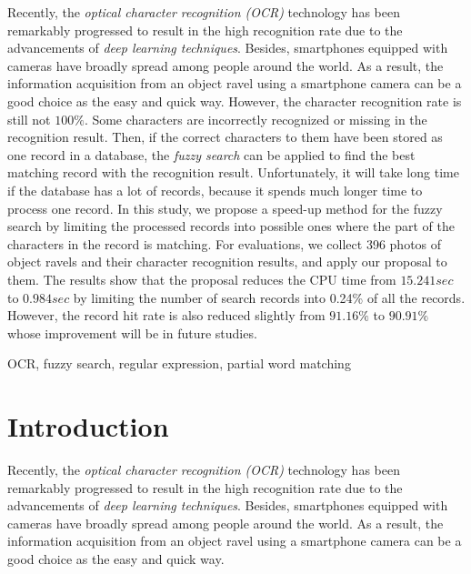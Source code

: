 \documentclass[technicalreport]{ieicej}
\begin{document}

\begin{eabstract}
    Recently, the {\em optical character recognition (OCR)} technology has been remarkably progressed to result in the high recognition rate due to the advancements of {\em deep learning techniques}. Besides, smartphones equipped with cameras have broadly spread among people around the world. As a result, the information acquisition from an object ravel using a smartphone camera can be a good choice as the easy and quick way.
    However, the character recognition rate is still not $100\%$. Some characters are incorrectly recognized or missing in the recognition result. Then, if the correct characters to them have been stored as one record in a database, the {\em fuzzy search} can be applied to find the best matching record with the recognition result. Unfortunately, it will take long time if the database has a lot of records, because it spends much longer time to process one record. 
    In this study, we propose a speed-up method for the fuzzy search by limiting the processed records into possible ones where the part of the characters in the record is matching. 
    For evaluations, we collect 396 photos of object ravels and their character recognition results, and apply our proposal to them. The results show that the proposal reduces the CPU time from $15.241sec$ to $0.984sec$ by limiting the number of search records into 0.24\% of all the records. However, the record hit rate is also reduced slightly from $91.16\%$ to $90.91\%$ whose improvement will be in future studies.
    
\end{eabstract}
\begin{ekeyword}
OCR, fuzzy search, regular expression, partial word matching
\end{ekeyword}
\maketitle

\section{Introduction}
    Recently, the {\em optical character recognition (OCR)} technology has been remarkably progressed to result in the high recognition rate due to the advancements of {\em deep learning techniques}. Besides, smartphones equipped with cameras have broadly spread among people around the world. As a result, the information acquisition from an object ravel using a smartphone camera can be a good choice as the easy and quick way.
\end{document}
